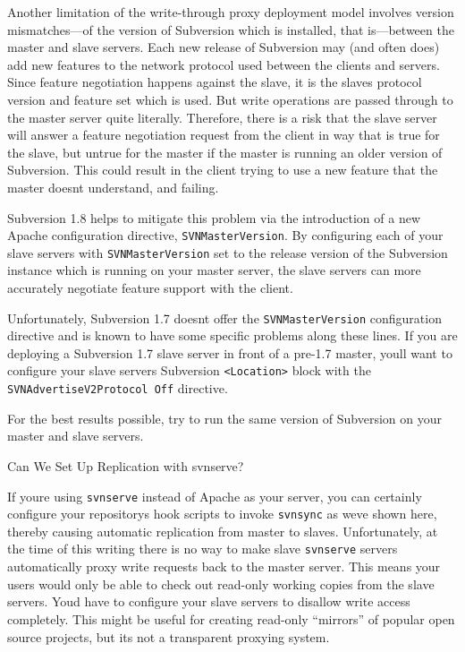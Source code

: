 Another limitation of the write-through proxy deployment model involves
version mismatches---of the version of Subversion which is installed,
that is---between the master and slave servers. Each new release of
Subversion may (and often does) add new features to the network protocol
used between the clients and servers. Since feature negotiation happens
against the slave, it is the slave\textquotesingle s protocol version
and feature set which is used. But write operations are passed through
to the master server quite literally. Therefore, there is a risk that
the slave server will answer a feature negotiation request from the
client in way that is true for the slave, but untrue for the master if
the master is running an older version of Subversion. This could result
in the client trying to use a new feature that the master
doesn\textquotesingle t understand, and failing.

Subversion 1.8 helps to mitigate this problem via the introduction of a
new Apache configuration directive, \texttt{SVNMasterVersion}. By
configuring each of your slave servers with \texttt{SVNMasterVersion}
set to the release version of the Subversion instance which is running
on your master server, the slave servers can more accurately negotiate
feature support with the client.

Unfortunately, Subversion 1.7 doesn\textquotesingle t offer the
\texttt{SVNMasterVersion} configuration directive and is known to have
some specific problems along these lines. If you are deploying a
Subversion 1.7 slave server in front of a pre-1.7 master,
you\textquotesingle ll want to configure your slave
server\textquotesingle s Subversion
\texttt{\textless{}Location\textgreater{}} block with the
\texttt{SVNAdvertiseV2Protocol\ Off} directive.

For the best results possible, try to run the same version of Subversion
on your master and slave servers.

Can We Set Up Replication with svnserve?

If you\textquotesingle re using \texttt{svnserve} instead of Apache as
your server, you can certainly configure your
repository\textquotesingle s hook scripts to invoke \texttt{svnsync} as
we\textquotesingle ve shown here, thereby causing automatic replication
from master to slaves. Unfortunately, at the time of this writing there
is no way to make slave \texttt{svnserve} servers automatically proxy
write requests back to the master server. This means your users would
only be able to check out read-only working copies from the slave
servers. You\textquotesingle d have to configure your slave servers to
disallow write access completely. This might be useful for creating
read-only ``mirrors'' of popular open source projects, but
it\textquotesingle s not a transparent proxying system.

